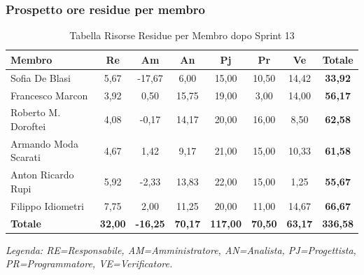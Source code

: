 \subsubsection{Prospetto ore residue per membro}
\begin{table}[H]
    \centering
    \renewcommand{\arraystretch}{1.3}
    \begin{tabularx}{\textwidth}{|X|c|c|c|c|c|c|c|}
        \hline
        \textbf{Membro} & \textbf{Re} & \textbf{Am} & \textbf{An} &
        \textbf{Pj} & \textbf{Pr} & \textbf{Ve} & \textbf{Totale} \\
        \hline
        Sofia De Blasi       &  5,67 & -17,67 &  6,00 & 15,00 & 10,50 & 14,42 & \textbf{33,92} \\
        Francesco Marcon     &  3,92 &   0,50 & 15,75 & 19,00 &  3,00 & 14,00 & \textbf{56,17} \\
        Roberto M. Doroftei  &  4,08 &  -0,17 & 14,17 & 20,00 & 16,00 &  8,50 & \textbf{62,58} \\
        Armando Moda Scarati &  4,67 &   1,42 &  9,17 & 21,00 & 15,00 & 10,33 & \textbf{61,58} \\
        Anton Ricardo Rupi   &  5,92 &  -2,33 & 13,83 & 22,00 & 15,00 &  1,25 & \textbf{55,67} \\
        Filippo Idiometri    &  7,75 &   2,00 & 11,25 & 20,00 & 11,00 & 14,67 & \textbf{66,67} \\
        \hline
        \textbf{Totale} &
        \textbf{32,00} & \textbf{-16,25} & \textbf{70,17} &
        \textbf{117,00} & \textbf{70,50} & \textbf{63,17} &
        \textbf{336,58} \\
        \hline
    \end{tabularx}
    \begin{minipage}{\textwidth}
        \smallskip
        \footnotesize\textit{Legenda: RE=Responsabile, AM=Amministratore,
        AN=Analista, PJ=Progettista, PR=Programmatore, VE=Verificatore.}
    \end{minipage}
    \caption{Tabella Risorse Residue per Membro dopo Sprint 13}
\end{table}

